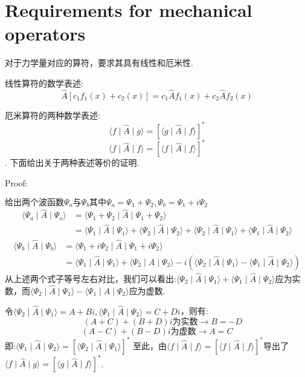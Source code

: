 \documentclass[28pt,openany]{book}
\begin{document}
\section{Requirements for mechanical operators}
\textbf{ }\textbf{ }
对于力学量对应的算符，要求其具有线性和厄米性.

线性算符的数学表述:
$$\hat{A}[c_{1}f_{1}(x)+c_{2}(x)]=c_{1}\hat{A}f_{1}(x)+c_{2}\hat{A}f_{2}(x)$$

厄米算符的两种数学表述:
$$\langle f \mid \hat{A} \mid g \rangle=[\langle g \mid \hat{A} \mid f \rangle]^{*}$$
$$\langle f \mid \hat{A} \mid f \rangle=[\langle f \mid \hat{A} \mid f \rangle]^{*}$$.
下面给出关于两种表述等价的证明.

Proof:

$\mbox{给出两个波函数}\Psi_{a}\mbox{与}\Psi_{b}\mbox{其中}\Psi_{a}=\Psi_{1}+\Psi_{2},\Psi_{b}=\Psi_{1}+i\Psi_{2}$
\begin{align*}
    \langle \Psi_{a}\mid \hat{A}\mid\Psi_{a}\rangle &=\langle \Psi_{1}+\Psi_{2}\mid \hat{A}\mid\Psi_{1}+\Psi_{2}\rangle\\
    &=\langle \Psi_{1}\mid \hat{A} \mid \Psi_{1} \rangle+\langle \Psi_{2}\mid \hat{A} \mid \Psi_{2} \rangle+\langle \Psi_{2}\mid \hat{A} \mid \Psi_{1} \rangle+\langle \Psi_{1}\mid \hat{A} \mid \Psi_{2} \rangle
\end{align*}
\begin{align*}
    \langle \Psi_{b}\mid \hat{A}\mid\Psi_{b}\rangle &=\langle \Psi_{1}+i\Psi_{2}\mid \hat{A}\mid\Psi_{1}+i\Psi_{2}\rangle\\
    &=\langle \Psi_{1}\mid \hat{A} \mid \Psi_{1} \rangle+\langle \Psi_{2}\mid \hat{A} \mid \Psi_{2} \rangle-i(\langle \Psi_{2}\mid \hat{A} \mid \Psi_{1} \rangle-\langle \Psi_{1}\mid \hat{A} \mid \Psi_{2} \rangle)
\end{align*}
\textbf{ }\textbf{ }
从上述两个式子等号左右对比，我们可以看出:$\langle \Psi_{2}\mid \hat{A} \mid \Psi_{1} \rangle+\langle \Psi_{1}\mid \hat{A} \mid \Psi_{2} \rangle$应为实数，而$\langle \Psi_{2}\mid \hat{A} \mid \Psi_{1} \rangle-\langle \Psi_{1}\mid \hat{A} \mid \Psi_{2} \rangle$应为虚数.

$\mbox{令}\langle \Psi_{2}\mid \hat{A} \mid \Psi_{1} \rangle=A+Bi,\langle \Psi_{1}\mid \hat{A} \mid \Psi_{2} \rangle=C+Di$，则有:
$$
\textbf{ }\textbf{ }(A+C)+(B+D)i\mbox{为实数}\to B=-D
$$
$$
(A-C)+(B-D)i\mbox{为虚数}\to A=C 
$$
\textbf{ }\textbf{ }
即:$\langle \Psi_{1}\mid \hat{A} \mid \Psi_{2} \rangle=[\langle \Psi_{2}\mid \hat{A} \mid \Psi_{1} \rangle]^{*}$
至此，由$\langle f \mid \hat{A} \mid f \rangle=[\langle f \mid \hat{A} \mid f \rangle]^{*}$导出了$\langle f \mid \hat{A} \mid g \rangle=[\langle g \mid \hat{A} \mid f \rangle]^{*}$.
\end{document}
